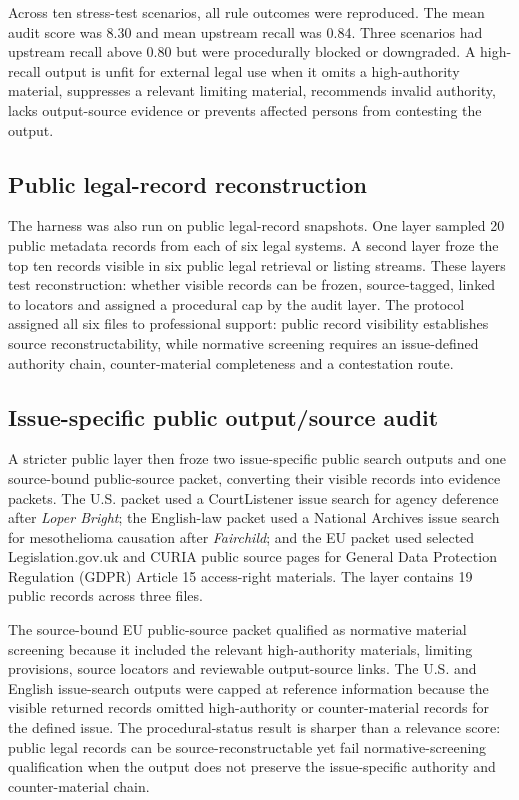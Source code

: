 \documentclass[12pt,a4paper]{article}
\begin{document}
Across ten stress-test scenarios, all rule outcomes were reproduced. The mean audit score was 8.30 and mean upstream recall was 0.84. Three scenarios had upstream recall above 0.80 but were procedurally blocked or downgraded. A high-recall output is unfit for external legal use when it omits a high-authority material, suppresses a relevant limiting material, recommends invalid authority, lacks output-source evidence or prevents affected persons from contesting the output.

\subsection{Public legal-record reconstruction}

The harness was also run on public legal-record snapshots. One layer sampled 20 public metadata records from each of six legal systems. A second layer froze the top ten records visible in six public legal retrieval or listing streams. These layers test reconstruction: whether visible records can be frozen, source-tagged, linked to locators and assigned a procedural cap by the audit layer. The protocol assigned all six files to professional support: public record visibility establishes source reconstructability, while normative screening requires an issue-defined authority chain, counter-material completeness and a contestation route.

\subsection{Issue-specific public output/source audit}

A stricter public layer then froze two issue-specific public search outputs and one source-bound public-source packet, converting their visible records into evidence packets. The U.S. packet used a CourtListener issue search for agency deference after \textit{Loper Bright}; the English-law packet used a National Archives issue search for mesothelioma causation after \textit{Fairchild}; and the EU packet used selected Legislation.gov.uk and CURIA public source pages for General Data Protection Regulation (GDPR) Article 15 access-right materials. The layer contains 19 public records across three files.

The source-bound EU public-source packet qualified as normative material screening because it included the relevant high-authority materials, limiting provisions, source locators and reviewable output-source links. The U.S. and English issue-search outputs were capped at reference information because the visible returned records omitted high-authority or counter-material records for the defined issue. The procedural-status result is sharper than a relevance score: public legal records can be source-reconstructable yet fail normative-screening qualification when the output does not preserve the issue-specific authority and counter-material chain.
\end{document}
